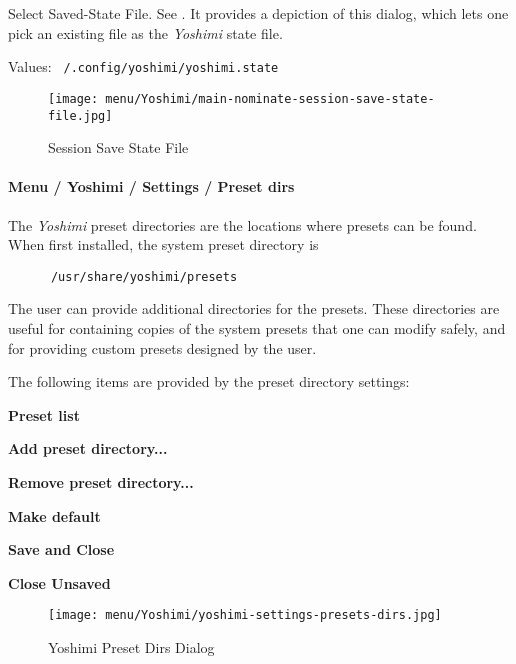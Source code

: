    Select Saved-State File.
   See .
   It provides a depiction of this dialog, which lets one pick an existing
   file as the \textsl{Yoshimi} state file.

   Values: \texttt{~/.config/yoshimi/yoshimi.state}

\begin{figure}[H]
   \centering 
   \texttt{[image: menu/Yoshimi/main-nominate-session-save-state-file.jpg]}
   \caption[Session Save State]{Session Save State File}
   \label{fig:session_save_state} 
\end{figure}

\paragraph{Menu / Yoshimi / Settings / Preset dirs}
\label{paragraph:menu_yoshimi_settings_preset_dirs}

   The \textsl{Yoshimi} preset directories are the locations where
   presets can be found.  When first installed, the system
   preset directory is

   \begin{verbatim}
      /usr/share/yoshimi/presets
   \end{verbatim}
   
   The user can provide additional directories for the presets.
   These directories are useful for containing copies of the system
   presets that one can modify safely, and for providing custom
   presets designed by the user.

   The following items are provided by the preset directory settings:

   \begin{enumber}
      \item \textbf{Preset list}
      \item \textbf{Add preset directory...}
      \item \textbf{Remove preset directory...}
      \item \textbf{Make default}
      \item \textbf{Save and Close}
      \item \textbf{Close Unsaved}
   \end{enumber}


\begin{figure}[H]
   \centering 
   \texttt{[image: menu/Yoshimi/yoshimi-settings-presets-dirs.jpg]}
   \caption[Preset Dirs Tab]{Yoshimi Preset Dirs Dialog}
   \label{fig:yoshimi_presets_dirs_tab}
\end{figure}

